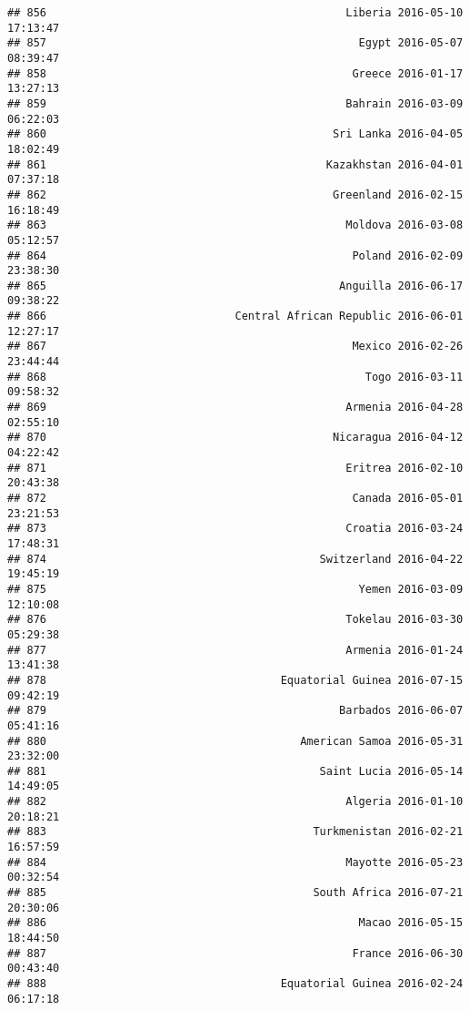 \documentclass[
]{article}
\begin{document}
\begin{verbatim}
## 856                                              Liberia 2016-05-10 17:13:47
## 857                                                Egypt 2016-05-07 08:39:47
## 858                                               Greece 2016-01-17 13:27:13
## 859                                              Bahrain 2016-03-09 06:22:03
## 860                                            Sri Lanka 2016-04-05 18:02:49
## 861                                           Kazakhstan 2016-04-01 07:37:18
## 862                                            Greenland 2016-02-15 16:18:49
## 863                                              Moldova 2016-03-08 05:12:57
## 864                                               Poland 2016-02-09 23:38:30
## 865                                             Anguilla 2016-06-17 09:38:22
## 866                             Central African Republic 2016-06-01 12:27:17
## 867                                               Mexico 2016-02-26 23:44:44
## 868                                                 Togo 2016-03-11 09:58:32
## 869                                              Armenia 2016-04-28 02:55:10
## 870                                            Nicaragua 2016-04-12 04:22:42
## 871                                              Eritrea 2016-02-10 20:43:38
## 872                                               Canada 2016-05-01 23:21:53
## 873                                              Croatia 2016-03-24 17:48:31
## 874                                          Switzerland 2016-04-22 19:45:19
## 875                                                Yemen 2016-03-09 12:10:08
## 876                                              Tokelau 2016-03-30 05:29:38
## 877                                              Armenia 2016-01-24 13:41:38
## 878                                    Equatorial Guinea 2016-07-15 09:42:19
## 879                                             Barbados 2016-06-07 05:41:16
## 880                                       American Samoa 2016-05-31 23:32:00
## 881                                          Saint Lucia 2016-05-14 14:49:05
## 882                                              Algeria 2016-01-10 20:18:21
## 883                                         Turkmenistan 2016-02-21 16:57:59
## 884                                              Mayotte 2016-05-23 00:32:54
## 885                                         South Africa 2016-07-21 20:30:06
## 886                                                Macao 2016-05-15 18:44:50
## 887                                               France 2016-06-30 00:43:40
## 888                                    Equatorial Guinea 2016-02-24 06:17:18

\end{verbatim}
\end{document}
